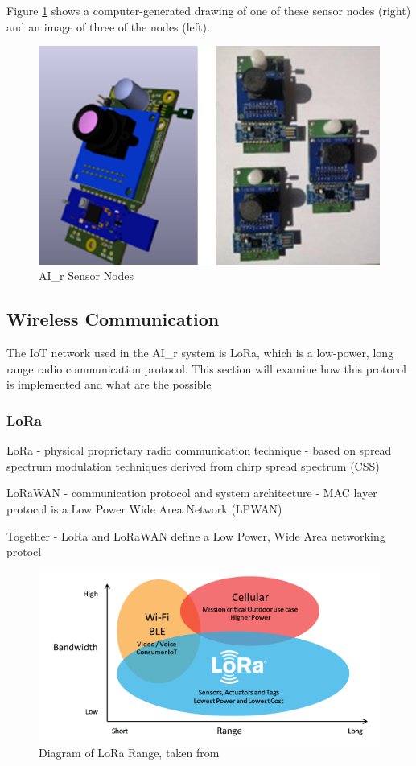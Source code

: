 \documentclass[a4paper,twoside,12pt]{report}
\begin{document}
Figure \ref{fig:SensorNodes} shows a computer-generated drawing of one of these sensor nodes (right) and an image of three of the nodes (left).

\begin{figure}[ht]
	\centering
	\includegraphics[width=0.5\linewidth]{images/SensorNodes.png}
	\caption{AI\_r Sensor Nodes}
	\label{fig:SensorNodes}
\end{figure}


\subsection{Wireless Communication}
The IoT network used in the AI\_r system is LoRa, which is a low-power, long range radio communication protocol. This section will examine how this protocol is implemented and what are the possible

\subsubsection{LoRa}
LoRa 
- physical proprietary radio communication technique
- based on spread spectrum modulation techniques derived from chirp spread spectrum (CSS)

LoRaWAN 
- communication protocol and system architecture
- MAC layer protocol
is a Low Power Wide Area Network (LPWAN)

Together - LoRa and LoRaWAN define a Low Power, Wide Area networking protocl

\begin{figure}[ht]
	\centering
	\includegraphics[width=0.5\linewidth]{images/LoRa_Why_Range.png}
	\caption{Diagram of LoRa Range, taken from \cite{Semtech_2023}}
	\label{fig:LoRaRange}
\end{figure}
\end{document}
